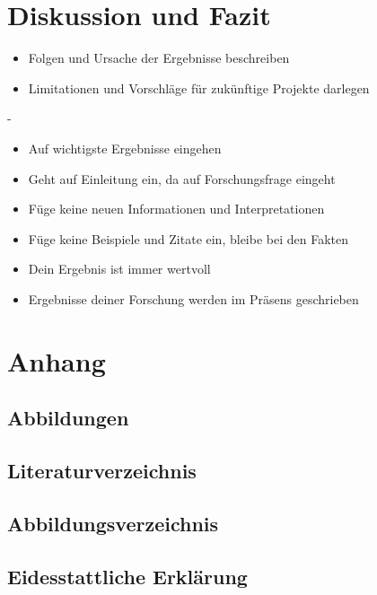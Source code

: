 \documentclass[a4paper,12pt,oneside]{article}
\begin{document}
  \section{Diskussion und Fazit}
    \begin{itemize}
      \item Folgen und Ursache der Ergebnisse beschreiben
      \item Limitationen und Vorschläge für zukünftige Projekte darlegen
    \end{itemize}
    -
    \begin{itemize}
      \item Auf wichtigste Ergebnisse eingehen
      \item Geht auf Einleitung ein, da auf Forschungsfrage eingeht
      \item Füge keine neuen Informationen und Interpretationen
      \item Füge keine Beispiele und Zitate ein, bleibe bei den Fakten
      \item Dein Ergebnis ist immer wertvoll
      \item Ergebnisse deiner Forschung werden im Präsens geschrieben
    \end{itemize}
  \section{Anhang}
    \subsection{Abbildungen}
    \subsection{Literaturverzeichnis}
      \printbibliography
    \subsection{Abbildungsverzeichnis}
    \subsection{Eidesstattliche Erklärung} 
\end{document}
